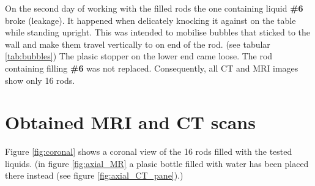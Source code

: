\documentclass[parskip,bibtotoc,final,twoside=false,titlepage,a4paper,english,12pt,titlepage,a4paper]{scrbook}
\begin{document}
On the second day of working with the filled rods the one containing liquid \textbf{\#6} broke (leakage).
It happened when delicately knocking it against on the table while standing upright.
This was intended to mobilise bubbles that sticked to the wall and make them travel vertically to on end of the rod. (see tabular \ref{tab:bubbles})
The plasic stopper on the lower end came loose.
The rod containing filling \textbf{\#6} was not replaced.
Consequently, all CT and MRI images show only 16 rods.

\section{Obtained MRI and CT scans}
Figure \ref{fig:coronal} shows a coronal view of the 16 rods filled with the tested liquids.
(in figure \ref{fig:axial_MR} a plasic bottle filled with water has been placed there instead (see figure \ref{fig:axial_CT_pane}).)
 
\end{document}
